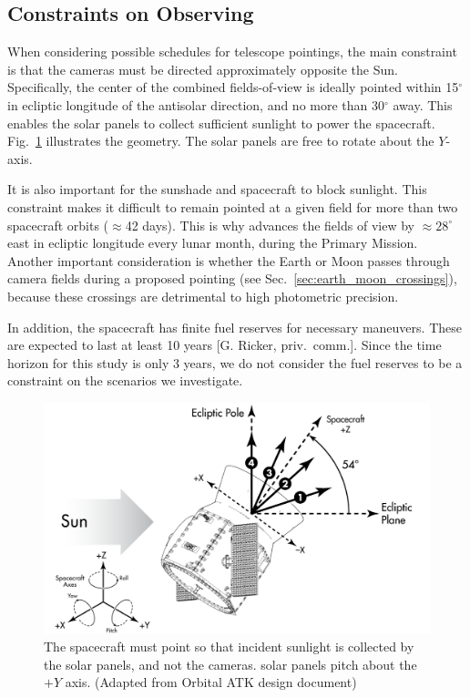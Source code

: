 \subsection{Constraints on \tesss Observing}
\label{sec:constraints_on_pointings}

When considering possible schedules for telescope pointings, the main
constraint is that the cameras must be directed approximately opposite
the Sun.  Specifically, the center of the combined fields-of-view is
ideally pointed within 15$^\circ$ in ecliptic longitude of the antisolar 
direction, and no more than 30$^\circ$ away.
This enables the solar panels to collect
sufficient sunlight to power the spacecraft.
Fig.~\ref{fig:spacecraft_angles} illustrates the geometry. The solar
panels are free to rotate about the $Y$-axis.

It is also important for the sunshade and 
spacecraft to block sunlight.
This constraint makes it difficult to remain pointed at a given field for more than two spacecraft orbits ($\approx$42 days). This is why \tess advances the fields of view by $\approx$$28^\circ$ east in ecliptic
longitude every lunar month, during the Primary Mission.  Another important consideration
is whether the Earth or Moon passes
through \tesss camera fields during a proposed pointing (see
Sec.~\ref{sec:earth_moon_crossings}), because these crossings are detrimental to high photometric precision.

In addition, the spacecraft has finite fuel reserves for necessary maneuvers.
These are expected to last at least 10 years [G. Ricker, priv.\ comm.].
Since the time horizon for this study is only 3 years, 
we do not consider the fuel reserves to be a constraint on the scenarios
we investigate.

\begin{figure}[!b]
	\centering
	\includegraphics{figures/spacecraft_angles_corr.pdf}
	\caption{The spacecraft must point so that incident sunlight is collected 
		by the solar panels, and not the cameras. \tesss solar panels pitch 
		about the $+Y$ axis. (Adapted from Orbital ATK design document) }
	\label{fig:spacecraft_angles}
\end{figure}
